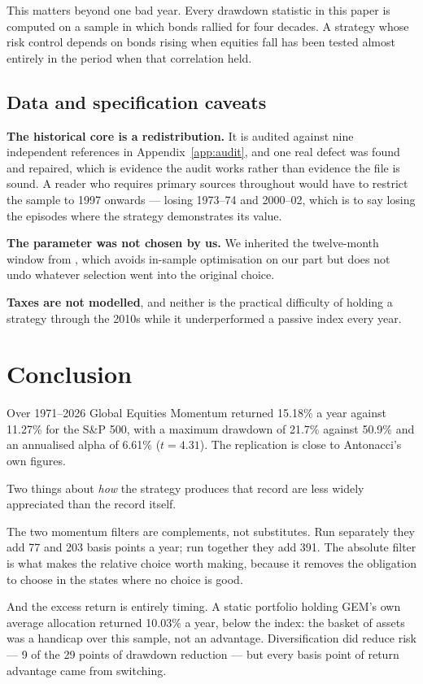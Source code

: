 \documentclass[11pt,a4paper]{article}
\let\oldsubsection\subsection
\renewcommand{\subsection}{\FloatBarrier\oldsubsection}
\let\oldsection\section
\renewcommand{\section}{\FloatBarrier\oldsection}
\begin{document}
This matters beyond one bad year. Every drawdown statistic in this paper is
computed on a sample in which bonds rallied for four decades. A strategy whose
risk control depends on bonds rising when equities fall has been tested almost
entirely in the period when that correlation held.

\subsection{Data and specification caveats}

\textbf{The historical core is a redistribution.} It is audited against nine
independent references in Appendix~\ref{app:audit}, and one real defect was
found and repaired, which is evidence the audit works rather than evidence the
file is sound. A reader who requires primary sources throughout would have to
restrict the sample to 1997 onwards --- losing 1973--74 and 2000--02, which is
to say losing the episodes where the strategy demonstrates its value.

\textbf{The parameter was not chosen by us.} We inherited the twelve-month
window from \citet{antonacci2016}, which avoids in-sample optimisation on our
part but does not undo whatever selection went into the original choice.

\textbf{Taxes are not modelled}, and neither is the practical difficulty of
holding a strategy through the 2010s while it underperformed a passive index
every year.

\section{Conclusion}
\label{sec:conclusion}

Over 1971--2026 Global Equities Momentum returned 15.18\% a year against
11.27\% for the S\&P 500, with a maximum drawdown of 21.7\% against 50.9\% and
an annualised alpha of 6.61\% ($t = 4.31$). The replication is close to
Antonacci's own figures.

Two things about \emph{how} the strategy produces that record are less widely
appreciated than the record itself.

The two momentum filters are complements, not substitutes. Run separately they
add 77 and 203 basis points a year; run together they add 391. The absolute
filter is what makes the relative choice worth making, because it removes the
obligation to choose in the states where no choice is good.

And the excess return is entirely timing. A static portfolio holding GEM's own
average allocation returned 10.03\% a year, below the index: the basket of
assets was a handicap over this sample, not an advantage. Diversification did
reduce risk --- 9 of the 29 points of drawdown reduction --- but every basis
point of return advantage came from switching.
\end{document}

